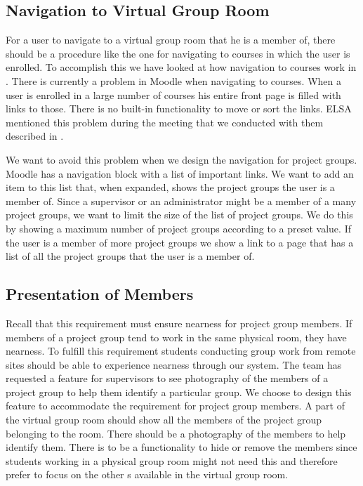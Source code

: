 \subsection{Navigation to Virtual Group Room}
\label{sub:designprojectgroupnavigation}
For a user to navigate to a virtual group room that he is a member of, there should be a procedure like the one for navigating to courses in which the user is enrolled.
To accomplish this we have looked at how navigation to courses work in \moodle{}.
There is currently a problem in Moodle when navigating to courses. 
When a user is enrolled in a large number of courses his entire front page is filled with links to those.
There is no built-in functionality to move or sort the links.
ELSA mentioned this problem during the meeting that we conducted with them described in .

We want to avoid this problem when we design the navigation for project groups.
Moodle has a navigation block with a list of important links.
We want to add an item to this list that, when expanded, shows the project groups the user is a member of.
Since a supervisor or an administrator might be a member of a many project groups, we want to limit the size of the list of project groups.
We do this by showing a maximum number of project groups according to a preset value.
If the user is a member of more project groups we show a link to a page that has a list of all the project groups that the user is a member of.


\subsection{Presentation of Members}
\label{sub:projGrpMembers}
Recall that this requirement must ensure nearness for project group members.
If members of a project group tend to work in the same physical room, they have nearness.
To fulfill this requirement students conducting group work from remote sites should be able to experience nearness through our system.
The \supervisorgroup{} team has requested a feature for supervisors to see photography of the members of a project group to help them identify a particular group.
We choose to design this feature to accommodate the requirement for project group members.
A part of the virtual group room should show all the members of the project group belonging to the room.
There should be a photography of the members to help identify them.
There is to be a functionality to hide or remove the members since students working in a physical group room might not need this and therefore prefer to focus on the other \detdeandrelaver[]s available in the virtual group room.

